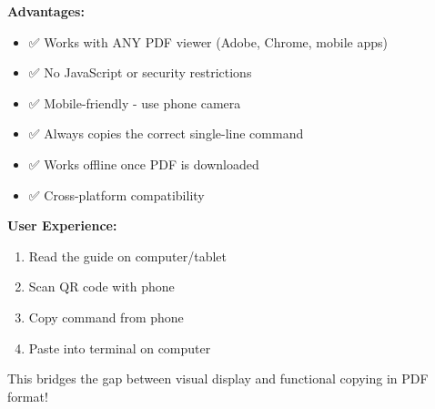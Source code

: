 \documentclass{article}
\begin{document}
\begin{tcolorbox}[colback=blue!5, colframe=blue!40, title=📱 Why QR Codes Work Best for PDF]
\textbf{Advantages:}
\begin{itemize}
    \item ✅ Works with ANY PDF viewer (Adobe, Chrome, mobile apps)
    \item ✅ No JavaScript or security restrictions
    \item ✅ Mobile-friendly - use phone camera
    \item ✅ Always copies the correct single-line command
    \item ✅ Works offline once PDF is downloaded
    \item ✅ Cross-platform compatibility
\end{itemize}

\textbf{User Experience:}
\begin{enumerate}
    \item Read the guide on computer/tablet
    \item Scan QR code with phone
    \item Copy command from phone
    \item Paste into terminal on computer
\end{enumerate}

This bridges the gap between visual display and functional copying in PDF format!
\end{tcolorbox}
\end{document}
